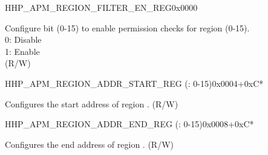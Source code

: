 \begin{register}{H}{HP\_APM\_REGION\_FILTER\_EN\_REG}{0x0000}\label{regdesc:HPAPMREGIONFILTERENREG}
%
%
\regnewline%
\begin{regdesc}\begin{reglist}
\label{fielddesc:HPAPMREGIONFILTEREN}\item [HP\_APM\_REGION\_FILTER\_EN] Configure bit  (0-15) to enable permission checks for region  (0-15).\\ 
0: Disable \\ 
1: Enable  \\ (R/W)
\end{reglist}\end{regdesc}
\end{register}


\begin{register}{H}{HP\_APM\_REGION\_ADDR\_START\_REG (: 0-15)}{0x0004+0xC*}\label{regdesc:HPAPMREGIONNADDRSTARTREG}
%
\regnewline%
\begin{regdesc}\begin{reglist}
\label{fielddesc:HPAPMREGIONNADDRSTART}\item [HP\_APM\_REGION\regindex{n}\_ADDR\_START] Configures the start address of region . (R/W)
\end{reglist}\end{regdesc}
\end{register}


\begin{register}{H}{HP\_APM\_REGION\_ADDR\_END\_REG (: 0-15)}{0x0008+0xC*}\label{regdesc:HPAPMREGIONNADDRENDREG}
%
\regnewline%
\begin{regdesc}\begin{reglist}
\label{fielddesc:HPAPMREGIONNADDREND}\item [HP\_APM\_REGION\regindex{n}\_ADDR\_END] Configures the end address of region . (R/W)
\end{reglist}\end{regdesc}
\end{register}


